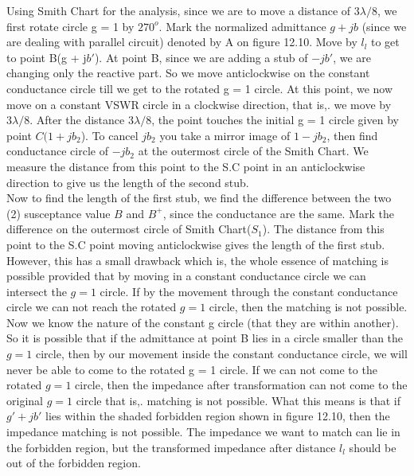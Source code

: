 Using Smith Chart for the analysis, since we are to move a distance of $3\lambda/8$, we first rotate circle g = 1 by $270^o$. Mark the normalized admittance $g + jb$ (since we are dealing with parallel circuit) denoted by A on figure 12.10. Move by $l_l$ to get to point B(g + j$b'$). At point B, since we are adding a stub of $-jb'$, we are changing only the reactive part. So we move anticlockwise on the constant conductance circle till we get to the rotated g = 1 circle. At this point, we now move on a constant VSWR circle in a clockwise direction, that is,. we move by $ 3\lambda/8$. After the distance $ 3\lambda/8$, the point touches the initial g = 1 circle given by point $C (1+ jb_2$). To cancel $jb_2$ you take a mirror image of $1-jb_2$, then find conductance circle of $ -jb_2$ at the outermost circle of the Smith Chart. We measure the distance from this point to the S.C point in an anticlockwise direction to give us the length of the second stub.\\

Now to find the length of the first stub, we find the difference between the two (2) susceptance value $B$ and $B^+$, since the conductance are the same. Mark the difference on the outermost circle of Smith Chart($S_1$). The distance from this point to the S.C point moving anticlockwise gives the length of the first stub. \\

However, this has a small drawback which is, the whole essence of matching is possible provided that by moving in a constant conductance circle we can intersect the $g = 1$ circle. If by the movement through the constant conductance circle we can not reach the rotated $g = 1$ circle, then the matching is not possible. Now we know the nature of the constant g circle (that they are within another). So it is possible that if the admittance at point B lies in a circle smaller than the $g = 1$ circle, then by our movement inside the constant conductance circle, we will never be able to come to the rotated g = 1 circle. If we can not come to the rotated $g = 1$ circle, then the impedance after transformation can not come to the original $g =1$ circle that is,. matching is not possible. What this means is that if $g' + jb'$ lies within the shaded forbidden region shown in figure 12.10, then the impedance matching is not possible. The impedance we want to match can lie in the forbidden region, but the transformed impedance after distance $ l_l$ should be out of the forbidden region.\\

